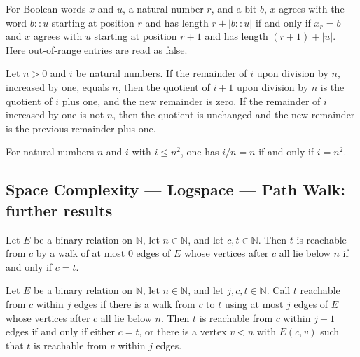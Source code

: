 \begin{lemma}
\label{Complexity.plainAt_cons}
\leanok
{}
For Boolean words $x$ and $u$, a natural number $r$, and a bit $b$, $x$ agrees with the
word $b::u$ starting at position $r$ and has length $r+|b::u|$ if and only if $x_r=b$
and $x$ agrees with $u$ starting at position $r+1$ and has length $(r+1)+|u|$. Here
out-of-range entries are read as false.
\end{lemma}

\begin{lemma}
\label{Complexity.divmod_succ}
\leanok
{}
Let $n>0$ and $i$ be natural numbers. If the remainder of $i$ upon division by $n$,
increased by one, equals $n$, then the quotient of $i+1$ upon division by $n$ is the
quotient of $i$ plus one, and the new remainder is zero. If the remainder of $i$
increased by one is not $n$, then the quotient is unchanged and the new remainder is the
previous remainder plus one.
\end{lemma}

\begin{lemma}
\label{Complexity.div_eq_self_iff}
\leanok
{}
For natural numbers $n$ and $i$ with $i\le n^2$, one has $i/n=n$ if and only if $i=n^2$.
\end{lemma}

\subsection*{Space Complexity --- Logspace --- Path Walk: further results}

\begin{lemma}
\label{Complexity.walkLe_zero_iff}
\leanok
{}
Let $E$ be a binary relation on $\mathbb{N}$, let $n\in\mathbb{N}$, and let
$c,t\in\mathbb{N}$. Then $t$ is reachable from $c$ by a walk of at most $0$ edges of $E$
whose vertices after $c$ all lie below $n$ if and only if $c=t$.
\end{lemma}

\begin{lemma}
\label{Complexity.walkLe_succ_iff_head}
\leanok
{}
Let $E$ be a binary relation on $\mathbb{N}$, let $n\in\mathbb{N}$, and let
$j,c,t\in\mathbb{N}$. Call $t$ reachable from $c$ within $j$ edges if there is a walk
from $c$ to $t$ using at most $j$ edges of $E$ whose vertices after $c$ all lie below
$n$. Then $t$ is reachable from $c$ within $j+1$ edges if and only if either $c=t$, or
there is a vertex $v<n$ with $E(c,v)$ such that $t$ is reachable from $v$ within $j$
edges.
\end{lemma}

